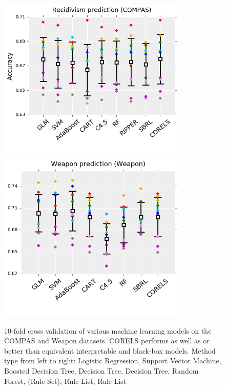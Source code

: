 \begin{figure}
\vspace{-2cm}
\begin{center}
\begin{minipage}{\textwidth}
\includegraphics[width=0.8\textwidth]{figs/compas_accuracy.png}
\includegraphics[width=0.8\textwidth]{figs/weapon_accuracy.png}
\vspace{-1cm}
\caption{10-fold cross validation of various machine learning models on the COMPAS and Weapon datasets.
CORELS performs as well as or better than equivalent interpretable and black-box models.
Method type from left to right: Logistic Regression, Support Vector Machine, Boosted Decision Tree, Decision Tree, Decision Tree, Random Forest, (Rule Set), Rule List, Rule List}
\end{minipage}
\end{center}
\label{fig:accuracy}
\end{figure}
